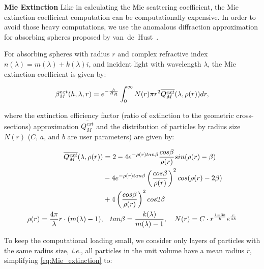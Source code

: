 \documentclass[journal]{vgtc}                %
\begin{document}
\vspace*{-3.5mm}
\noindent \textbf{Mie Extinction} \quad Like in calculating the Mie scattering coefficient, the Mie extinction coefficient computation can be computationally expensive. In order to avoid those heavy computations, we use the anomalous diffraction approximation for absorbing spheres proposed by van~de~Hust~\cite{Hulst:1981}.

For absorbing spheres with radius $r$ and complex refractive index $n(\lambda) = m(\lambda) + k(\lambda)i$, and incident light with wavelength $\lambda$, the Mie extinction coefficient is given by:

\vspace*{-2mm}
\begin{equation}\label{eq:Mie_extinction}
  \small
  \beta_M^{ext}(h, \lambda, r) = e^{-\frac{h}{H_R}} \int_{0}^{\infty}N(r)\pi r^2 \overline{Q_{M}^{ext}}(\lambda, \rho(r))dr ,
\end{equation} 

\noindent where the extinction efficiency factor (ratio of extinction to the geometric cross-sections) approximation $\overline{Q_{M}^{ext}}$ and the distribution of particles by radius size $N(r)$ ($C$, $a$, and $b$ are user parameters) are given by:

\vspace*{-3mm}
{
  \small
\begin{align}
\overline{Q_{M}^{ext}}(\lambda, \rho(r)) &= 2 - 4e^{-\rho(r) tan\beta}\frac{cos\beta}{\rho(r)}sin(\rho(r)-\beta) \notag\\
&- 4e^{-\rho(r)tan\beta}\left(\frac{cos\beta}{\rho(r)}\right)^2cos(\rho(r)-2\beta) \notag\\
&+ 4\left(\frac{cos\beta}{\rho(r)}\right)^2cos2\beta\label{eq:mie_ext_efficiency}\\
\rho(r) = \frac{4\pi}{\lambda}r\cdot(m(\lambda) - 1), &\quad tan\beta = \frac{k(\lambda)}{m(\lambda) - 1}, \quad
N(r) = C \cdot r^{\frac{1-3b}{b}}e^{\frac{r}{ab}} \notag
\label{eq:particle_distribution}
\end{align}
}
\vspace*{-4mm}

To keep the computational loading small, we consider only layers of particles with the same radius size, \textit{i.e.}, all particles in the unit volume have a mean radius $\overline{r}$, simplifying \autoref{eq:Mie_extinction} to:
\end{document}
